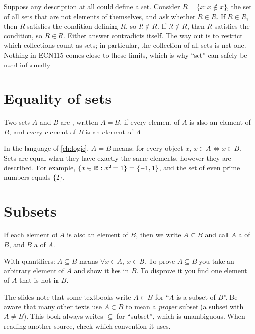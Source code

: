 \begin{external}
Suppose any description at all could define a set. Consider $R=\{x: x\notin x\}$, the set of all sets
that are not elements of themselves, and ask whether $R\in R$. If $R\in R$, then $R$ satisfies the
condition defining $R$, so $R\notin R$. If $R\notin R$, then $R$ satisfies the condition, so $R\in R$.
Either answer contradicts itself. The way out is to restrict which collections count as sets; in
particular, the collection of all sets is not one. Nothing in ECN115 comes close to these limits, which is
why ``set'' can safely be used informally.
\end{external}

\section{Equality of sets}\label{sec:set-equality}

\begin{definition}
Two sets $A$ and $B$ are , written $A=B$, if every element of $A$ is also an element of $B$,
and every element of $B$ is an element of $A$. 
\end{definition}

In the language of \cref{ch:logic}, $A=B$ means: for every object $x$, $x\in A\Leftrightarrow x\in B$. Sets
are equal when they have exactly the same elements, however they are described. For example,
$\{x\in\mathbb{R}: x^2=1\}=\{-1,1\}$, and the set of even prime numbers equals $\{2\}$.

\section{Subsets}\label{sec:subsets}

\begin{definition}
If each element of $A$ is also an element of $B$, then we write $A\subseteq B$ and call $A$ a
 of $B$, and $B$ a  of $A$. 
\end{definition}

With quantifiers: $A\subseteq B$ means $\forall x\in A,\ x\in B$. To prove $A\subseteq B$ you take an
arbitrary element of $A$ and show it lies in $B$. To disprove it you find one element of $A$ that is not
in $B$.

\begin{sourcenote}
The slides note that some textbooks write $A\subset B$ for ``$A$ is a subset of $B$''. Be aware that many
other texts use $A\subset B$ to mean a \emph{proper} subset (a subset with $A\ne B$). This book always
writes $\subseteq$ for ``subset'', which is unambiguous. When reading another source, check which
convention it uses.
\end{sourcenote}

